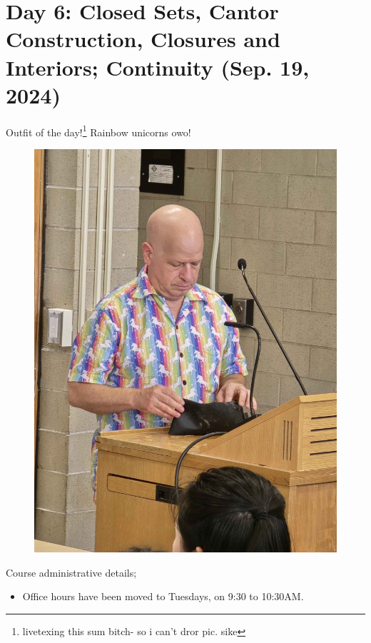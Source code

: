 \section{Day 6: Closed Sets, Cantor Construction, Closures and Interiors; Continuity (Sep. 19, 2024)}
Outfit of the day!\footnote{livetexing this sum bitch- so i can't dror pic. sike} Rainbow unicorns owo!
\begin{figure}[h]
    \centering
    \includegraphics[scale=0.1]{MAT327 Notes/Dror Shirts/dror day 6 shirt.jpg}
\end{figure}

\noindent Course administrative details;
\begin{itemize}
    \item Office hours have been moved to Tuesdays, on 9:30 to 10:30AM.
\end{itemize}

